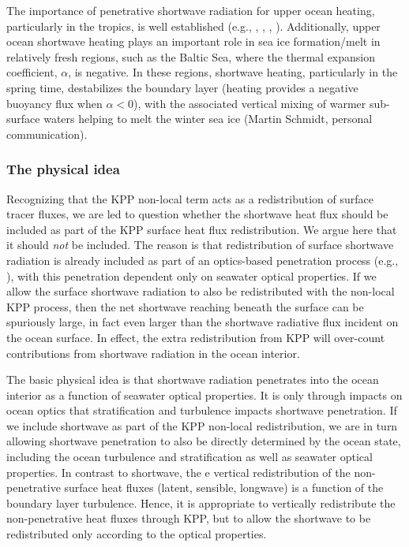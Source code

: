 The importance of penetrative shortwave radiation for upper ocean
heating, particularly in the tropics, is well established (e.g.,
\cite{Sweeneyetal}, \cite{Manizza_etal2005},
\cite{Anderson_color_etal2007}, \cite{Anderson_color_etal2009}).
Additionally, upper ocean shortwave heating plays an important role in
sea ice formation/melt in relatively fresh regions, such as the Baltic
Sea, where the thermal expansion coefficient, $\alpha$, is negative.
In these regions, shortwave heating, particularly in the spring time,
destabilizes the boundary layer (heating provides a negative buoyancy
flux when $\alpha < 0$), with the associated vertical mixing of warmer
sub-surface waters helping to melt the winter sea ice (Martin Schmidt,
personal communication).


\subsubsection{The physical idea}

Recognizing that the KPP non-local term acts as a redistribution of
surface tracer fluxes, we are led to question whether the shortwave
heat flux should be included as part of the KPP surface heat flux
redistribution.  We argue here that it should {\it not} be included.
The reason is that redistribution of surface shortwave radiation is
already included as part of an optics-based penetration process (e.g.,
\cite{Manizza_etal2005}), with this penetration dependent only on
seawater optical properties.  If we allow the surface shortwave
radiation to also be redistributed with the non-local KPP process,
then the net shortwave reaching beneath the surface can be spuriously
large, in fact even larger than the shortwave radiative flux incident
on the ocean surface.  In effect, the extra redistribution from KPP
will over-count contributions from shortwave radiation in the ocean
interior.

The basic physical idea is that shortwave radiation penetrates into
the ocean interior as a function of seawater optical properties.  It
is only through impacts on ocean optics that stratification and
turbulence impacts shortwave penetration.  If we include shortwave as
part of the KPP non-local redistribution, we are in turn allowing
shortwave penetration to also be directly determined by the ocean
state, including the ocean turbulence and stratification as well as
seawater optical properties.  In contrast to shortwave, the e vertical
redistribution of the non-penetrative surface heat fluxes (latent,
sensible, longwave) is a function of the boundary layer turbulence.
Hence, it is appropriate to vertically redistribute the
non-penetrative heat fluxes through KPP, but to allow the shortwave to
be redistributed only according to the optical properties.


